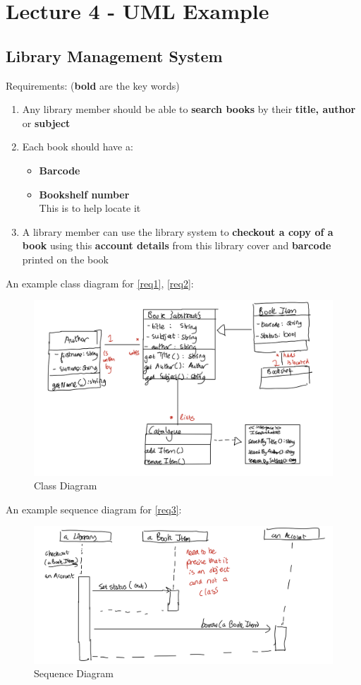\documentclass{article}
\begin{document}
\section{Lecture 4 - UML Example}
\subsection*{Library Management System}
Requirements: (\textbf{bold} are the key words)
\begin{enumerate}
    \item \label{req1} Any library member should be able to \textbf{search books} by their \textbf{title, author} or \textbf{subject}
    \item \label{req2} Each book should have a: 
    \begin{itemize}
        \item \textbf{Barcode}
        \item \textbf{Bookshelf number}
        \\ This is to help locate it
    \end{itemize}
    \item \label{req3} A library member can use the library system to \textbf{checkout a copy of a book} using this \textbf{account details} from this library cover and \textbf{barcode} printed on the book
\end{enumerate}
An example class diagram for \eqref{req1}, \eqref{req2}:
\begin{figure}[H]
    \centering
    \includegraphics[width = 0.7\linewidth]{Pictures/Screenshot 2023-02-01 at 11.54.43.png}
    \caption{Class Diagram}
\end{figure}
An example sequence diagram for \eqref{req3}:
\begin{figure}[H]
    \centering
    \includegraphics[width = 0.7\linewidth]{Pictures/Screenshot 2023-02-01 at 11.57.39.png}
    \caption{Sequence Diagram}    
\end{figure}
\end{document}
